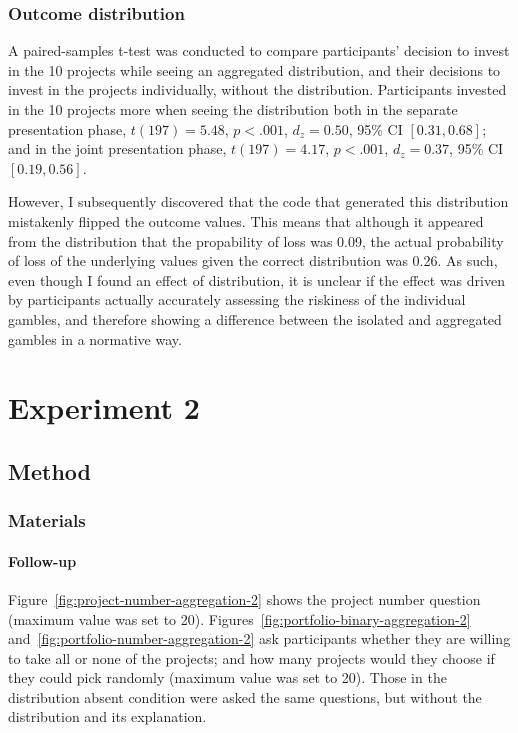 \documentclass[a4paper, nobind, dvipsnames]{templates/ociamthesis}
\theoremstyle{definition}
\theoremstyle{definition}
\theoremstyle{definition}
\theoremstyle{definition}
\theoremstyle{remark}
\begin{document}
\hypertarget{outcome-distribution-aggregation-1}{%
\subsubsection{Outcome distribution}\label{outcome-distribution-aggregation-1}}

A paired-samples t-test was conducted to compare participants' decision to
invest in the 10 projects while seeing an aggregated distribution, and their
decisions to invest in the projects individually, without the distribution.
Participants invested in the 10 projects more when seeing the distribution both
in the separate presentation phase,
\(t(197) = 5.48\), \(p < .001\), \(d_z = 0.50\), 95\% CI \([0.31, 0.68]\); and in the joint
presentation phase, \(t(197) = 4.17\), \(p < .001\), \(d_z = 0.37\), 95\% CI \([0.19, 0.56]\).

However, I subsequently discovered that the code that generated this
distribution mistakenly flipped the outcome values. This means that although it
appeared from the distribution that the propability of loss was
0.09, the actual probability of loss of the
underlying values given the correct distribution was
0.26. As such, even though I found an
effect of distribution, it is unclear if the effect was driven by participants
actually accurately assessing the riskiness of the individual gambles, and
therefore showing a difference between the isolated and aggregated gambles in a
normative way.

\section{Experiment 2}

\subsection{Method}

\subsubsection{Materials}

\hypertarget{follow-up-materials-aggregation-2-appendix}{%
\paragraph{Follow-up}\label{follow-up-materials-aggregation-2-appendix}}

Figure~\ref{fig:project-number-aggregation-2} shows the project number
question (maximum value was set to 20).
Figures~\ref{fig:portfolio-binary-aggregation-2}
and~\ref{fig:portfolio-number-aggregation-2} ask participants whether they are
willing to take all or none of the projects; and how many projects would they
choose if they could pick randomly (maximum value was set to 20). Those in the
distribution absent condition were asked the same questions, but without the
distribution and its explanation.
\end{document}
